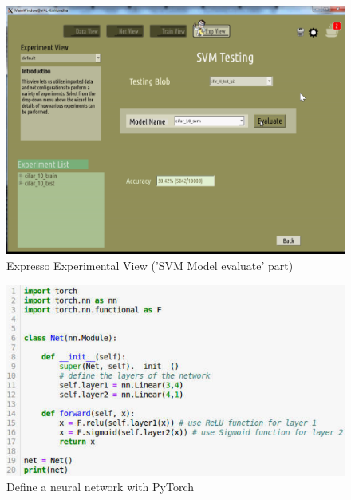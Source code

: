 \begin{figure}[!ht]
\center
    \includegraphics[scale=0.9]{images_expresso/13_exp_svm.png}
    \caption{Expresso Experimental View ('SVM Model evaluate' part)}
\end{figure}

\begin{figure}[!ht]
\center
    \includegraphics[scale=0.5]{figures/define_nn.png}
    \caption{Define a neural network with PyTorch}
\end{figure}